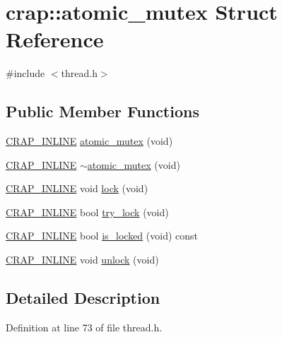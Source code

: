 \hypertarget{structcrap_1_1atomic__mutex}{\section{crap\+:\+:atomic\+\_\+mutex Struct Reference}
\label{structcrap_1_1atomic__mutex}
}


{\ttfamily \#include $<$thread.\+h$>$}

\subsection*{Public Member Functions}
\begin{DoxyCompactItemize}
\item 
\hyperlink{config__x86_8h_a5a40526b8d842e7ff731509998bb0f1c}{C\+R\+A\+P\+\_\+\+I\+N\+L\+I\+N\+E} \hyperlink{structcrap_1_1atomic__mutex_a54cae5ed28489fe821b365474dba7829}{atomic\+\_\+mutex} (void)
\item 
\hyperlink{config__x86_8h_a5a40526b8d842e7ff731509998bb0f1c}{C\+R\+A\+P\+\_\+\+I\+N\+L\+I\+N\+E} \hyperlink{structcrap_1_1atomic__mutex_adda57df22d546931c28a96065a82639d}{$\sim$atomic\+\_\+mutex} (void)
\item 
\hyperlink{config__x86_8h_a5a40526b8d842e7ff731509998bb0f1c}{C\+R\+A\+P\+\_\+\+I\+N\+L\+I\+N\+E} void \hyperlink{structcrap_1_1atomic__mutex_a9beac3f229645619a515a27073e00a72}{lock} (void)
\item 
\hyperlink{config__x86_8h_a5a40526b8d842e7ff731509998bb0f1c}{C\+R\+A\+P\+\_\+\+I\+N\+L\+I\+N\+E} bool \hyperlink{structcrap_1_1atomic__mutex_a5cd53b9c6d65fe8c20c5e3a0efe1f3f8}{try\+\_\+lock} (void)
\item 
\hyperlink{config__x86_8h_a5a40526b8d842e7ff731509998bb0f1c}{C\+R\+A\+P\+\_\+\+I\+N\+L\+I\+N\+E} bool \hyperlink{structcrap_1_1atomic__mutex_a7131974f75e49f901285834ba96010a6}{is\+\_\+locked} (void) const 
\item 
\hyperlink{config__x86_8h_a5a40526b8d842e7ff731509998bb0f1c}{C\+R\+A\+P\+\_\+\+I\+N\+L\+I\+N\+E} void \hyperlink{structcrap_1_1atomic__mutex_a1c239a2b3ceef7083189c3523ad5df52}{unlock} (void)
\end{DoxyCompactItemize}


\subsection{Detailed Description}


Definition at line 73 of file thread.\+h.



